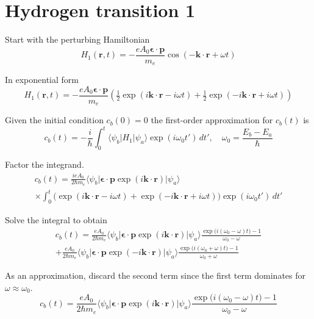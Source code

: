 

\section*{Hydrogen transition 1}

Start with the perturbing Hamiltonian
\begin{equation*}
H_1(\mathbf r,t)=-\frac{eA_0\boldsymbol{\epsilon}\cdot\mathbf p}{m_e}
\cos(-\mathbf k\cdot\mathbf r+\omega t)
\end{equation*}

In exponential form
\begin{equation*}
H_1(\mathbf r,t)=-\frac{eA_0\boldsymbol{\epsilon}\cdot\mathbf p}{m_e}
\left(\tfrac{1}{2}\exp(i\mathbf k\cdot\mathbf r-i\omega t)
+\tfrac{1}{2}\exp(-i\mathbf k\cdot\mathbf r+i\omega t)\right)
\end{equation*}

Given the initial condition $c_b(0)=0$ the first-order approximation for $c_b(t)$ is
\begin{equation*}
c_b(t)=-\frac{i}{\hbar}\int_0^t
\langle\psi_b|H_1|\psi_a\rangle\exp(i\omega_0t')\,dt',\quad
\omega_0=\frac{E_b-E_a}{\hbar}
\end{equation*}

Factor the integrand.
\begin{multline*}
c_b(t)=\frac{ieA_0}{2\hbar m_e}
\langle\psi_b|\boldsymbol{\epsilon}\cdot\mathbf p\exp(i\mathbf k\cdot\mathbf r)|\psi_a\rangle
\\
\times\int_0^t
\bigl(\exp(i\mathbf k\cdot\mathbf r-i\omega t)
+\exp(-i\mathbf k\cdot\mathbf r+i\omega t)\bigr)
\exp(i\omega_0t')\,dt'
\end{multline*}

Solve the integral to obtain
\begin{multline*}
c_b(t)=\frac{eA_0}{2\hbar m_e}
\langle\psi_b|\boldsymbol{\epsilon}\cdot\mathbf p\exp(i\mathbf k\cdot\mathbf r)|\psi_a\rangle
\frac{\exp\bigl(i(\omega_0-\omega)t\bigr)-1}{\omega_0-\omega}
\\
+\frac{eA_0}{2\hbar m_e}
\langle\psi_b|\boldsymbol{\epsilon}\cdot\mathbf p\exp(-i\mathbf k\cdot\mathbf r)|\psi_a\rangle
\frac{\exp\bigl(i(\omega_0+\omega)t\bigr)-1}{\omega_0+\omega}
\tag{1}
\end{multline*}

As an approximation, discard the second term since the first term
dominates for $\omega\approx\omega_0$.
\begin{equation*}
c_b(t)=\frac{eA_0}{2\hbar m_e}
\langle\psi_b|\boldsymbol{\epsilon}\cdot\mathbf p\exp(i\mathbf k\cdot\mathbf r)|\psi_a\rangle
\frac{\exp\bigl(i(\omega_0-\omega)t\bigr)-1}{\omega_0-\omega}
\end{equation*}

